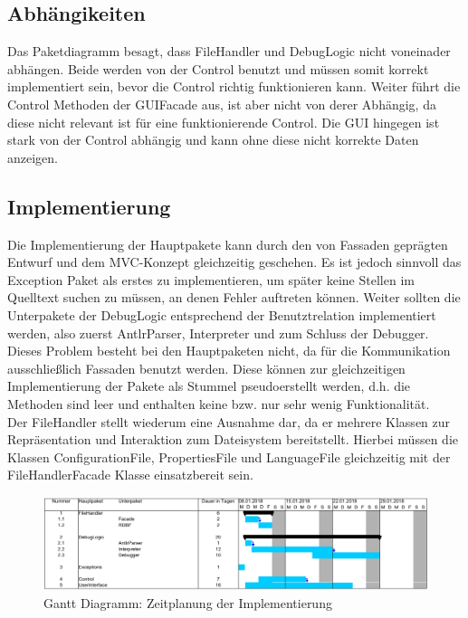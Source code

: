 \documentclass[parskip=full]{scrartcl}
\begin{document}
\subsection{Abhängikeiten}
Das Paketdiagramm besagt, dass FileHandler und DebugLogic nicht voneinader abhängen.
Beide werden von der Control benutzt und müssen somit korrekt implementiert sein, bevor die Control richtig funktionieren kann. Weiter führt die Control Methoden der GUIFacade aus, ist aber nicht von derer Abhängig, da diese nicht relevant ist für eine funktionierende Control.
Die GUI hingegen ist stark von der Control abhängig und kann ohne diese nicht korrekte Daten anzeigen.

\subsection{Implementierung}
Die Implementierung der Hauptpakete kann durch den von Fassaden geprägten Entwurf und dem MVC-Konzept gleichzeitig geschehen. Es ist jedoch sinnvoll das Exception Paket als erstes zu implementieren, um später keine Stellen im Quelltext suchen zu müssen, an denen Fehler auftreten können.
Weiter sollten die Unterpakete der DebugLogic entsprechend der Benutztrelation implementiert werden, also zuerst AntlrParser, Interpreter und zum Schluss der Debugger.
Dieses Problem besteht bei den Hauptpaketen nicht, da für die Kommunikation ausschließlich Fassaden benutzt werden. Diese können zur gleichzeitigen Implementierung der Pakete als Stummel pseudoerstellt werden, d.h. die Methoden sind leer und enthalten keine bzw. nur sehr wenig Funktionalität.\\
Der FileHandler stellt wiederum eine Ausnahme dar, da er mehrere Klassen zur Repräsentation und Interaktion zum Dateisystem bereitstellt.
Hierbei müssen die Klassen ConfigurationFile, PropertiesFile und LanguageFile gleichzeitig mit der FileHandlerFacade Klasse einsatzbereit sein.

\begin{figure}[!h]
\centering
\includegraphics[width=1.0\textwidth]{GanttDiagramm_withArrows.pdf}
\caption{Gantt Diagramm: Zeitplanung der Implementierung}
\end{figure}
\end{document}
